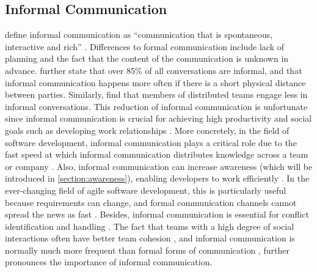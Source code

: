 

\subsection{Informal Communication}
\citeauthor{kraut1990informal} define informal communication as \enquote{communication that is spontaneous, interactive and rich} \autocite[p.~5]{kraut1990informal}. Differences to formal communication include lack of planning and the fact that the content of the communication is unknown in advance. \textcite{kraut1990informal} further state that over 85\% of all conversations are informal, and that informal communication happens more often if there is a short physical distance between parties. Similarly, \textcite{hinds2005understanding} find that members of distributed teams engage less in informal conversations. This reduction of informal communication is unfortunate since informal communication is crucial for achieving high productivity and social goals \autocite{kraut1990informal} such as developing work relationships \autocite{comella2020revisiting, olson2006bridging}. More concretely, in the field of software development, informal communication plays a critical role due to the fast speed at which informal communication distributes knowledge across a team or company \autocite{french1998study, mockus2001challenges}. Also, informal communication can increase awareness (which will be introduced in \autoref{section:awareness}), enabling developers to work efficiently \autocite{herbsleb2001global}. In the ever-changing field of agile software development, this is particularly useful because requirements can change, and formal communication channels cannot spread the news as fast \autocite{french1998study, mockus2001challenges}. Besides, informal communication is essential for conflict identification and handling \autocite{hinds2005understanding}. The fact that teams with a high degree of social interactions often have better team cohesion \autocite{staehle2014management}, and informal communication is normally much more frequent than formal forms of communication \autocite{kraut1990informal}, further pronounces the importance of informal communication.

